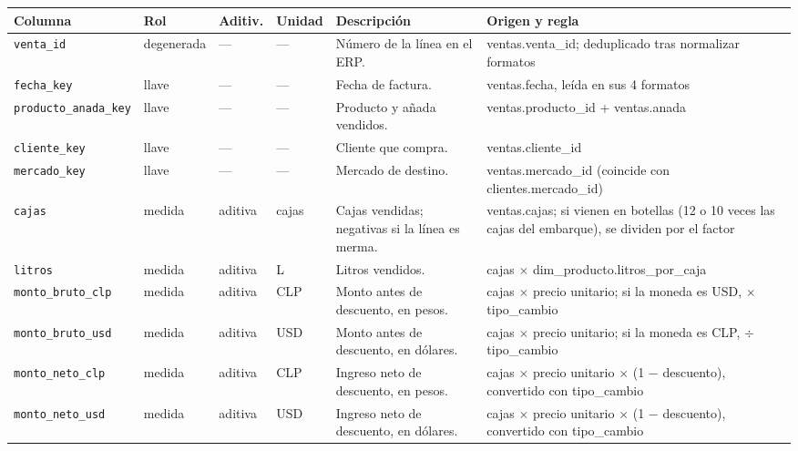 {\footnotesize
\begin{longtable}{@{}>{\raggedright\arraybackslash}p{}>{\raggedright\arraybackslash}p{}>{\raggedright\arraybackslash}p{}>{\raggedright\arraybackslash}p{}>{\raggedright\arraybackslash}p{}>{\raggedright\arraybackslash}p{}@{}}
\toprule
Columna & Rol & Aditiv. & Unidad & Descripción & Origen y regla \\
\midrule
\endhead
\texttt{venta\_id} & degenerada & — & — & Número de la línea en el ERP. & ventas.\allowbreak{}venta\_id; deduplicado tras normalizar formatos \\
\texttt{fecha\_key} & llave & — & — & Fecha de factura. & ventas.\allowbreak{}fecha, leída en sus 4 formatos \\
\texttt{producto\_anada\_key} & llave & — & — & Producto y añada vendidos. & ventas.\allowbreak{}producto\_id + ventas.\allowbreak{}anada \\
\texttt{cliente\_key} & llave & — & — & Cliente que compra. & ventas.\allowbreak{}cliente\_id \\
\texttt{mercado\_key} & llave & — & — & Mercado de destino. & ventas.\allowbreak{}mercado\_id (coincide con clientes.\allowbreak{}mercado\_id) \\
\texttt{cajas} & medida & aditiva & cajas & Cajas vendidas; negativas si la línea es merma. & ventas.\allowbreak{}cajas; si vienen en botellas (12 o 10 veces las cajas del embarque), se dividen por el factor \\
\texttt{litros} & medida & aditiva & L & Litros vendidos. & cajas $\times$ dim\_producto.\allowbreak{}litros\_por\_caja \\
\texttt{monto\_bruto\_clp} & medida & aditiva & CLP & Monto antes de descuento, en pesos. & cajas $\times$ precio unitario; si la moneda es USD, $\times$ tipo\_cambio \\
\texttt{monto\_bruto\_usd} & medida & aditiva & USD & Monto antes de descuento, en dólares. & cajas $\times$ precio unitario; si la moneda es CLP, $\div$ tipo\_cambio \\
\texttt{monto\_neto\_clp} & medida & aditiva & CLP & Ingreso neto de descuento, en pesos. & cajas $\times$ precio unitario $\times$ (1 $-$ descuento), convertido con tipo\_cambio \\
\texttt{monto\_neto\_usd} & medida & aditiva & USD & Ingreso neto de descuento, en dólares. & cajas $\times$ precio unitario $\times$ (1 $-$ descuento), convertido con tipo\_cambio \\

\end{longtable}}
